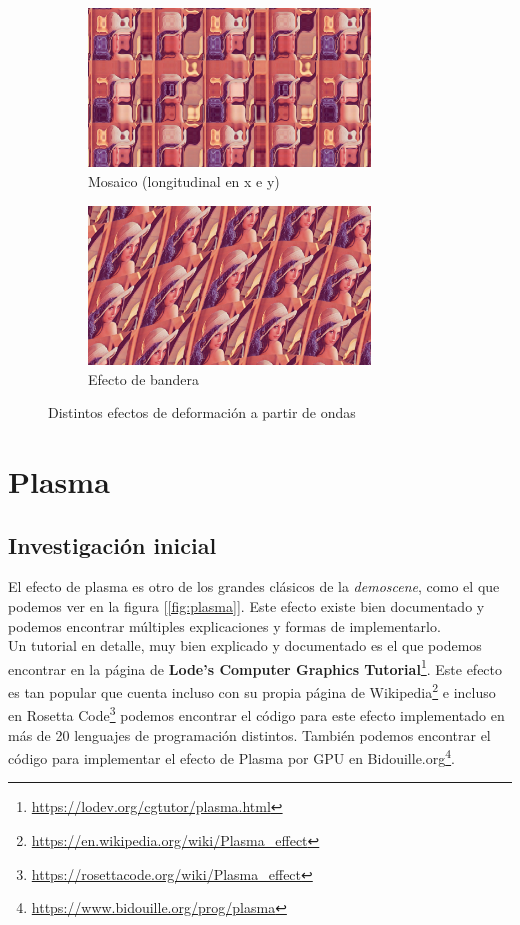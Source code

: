 \begin{figure}\ContinuedFloat
	\centering
	\begin{subfigure}[b]{0.48\textwidth}
		\centering
		\includegraphics[width=7.5cm]{archivos/deformation5}
		\caption{Mosaico (longitudinal en x e y)}
	\end{subfigure}
	\begin{subfigure}[b]{0.48\textwidth}
		\centering
		\includegraphics[width=7.5cm]{archivos/deformation6}
		\caption{Efecto de bandera}
	\end{subfigure}
	\caption{Distintos efectos de deformación a partir de ondas}
	\label{fig:alldeformations}
\end{figure}

\section{Plasma} \label{sec:plasma}

\subsection{Investigación inicial}

El efecto de plasma es otro de los grandes clásicos de la \emph{demoscene}, como el que podemos ver en la figura [\ref{fig:plasma}]. Este efecto existe bien documentado y podemos encontrar múltiples explicaciones y formas de implementarlo.\\

Un tutorial en detalle, muy bien explicado y documentado es el que podemos encontrar en la página de \textbf{Lode's Computer Graphics Tutorial}\footnote{\url{https://lodev.org/cgtutor/plasma.html}}. Este efecto es tan popular que cuenta incluso con su propia página de Wikipedia\footnote{\url{https://en.wikipedia.org/wiki/Plasma_effect}} e incluso en Rosetta Code\footnote{\url{https://rosettacode.org/wiki/Plasma_effect}} podemos encontrar el código para este efecto implementado en más de 20 lenguajes de programación distintos. También podemos encontrar el código para implementar el efecto de Plasma por GPU en Bidouille.org\footnote{\url{https://www.bidouille.org/prog/plasma}}.\\

